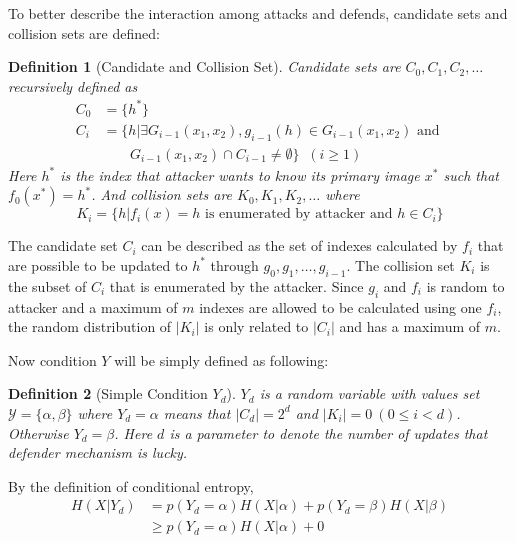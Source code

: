 \documentclass[10pt, conference, compsocconf]{IEEEtran}
\newtheorem{mydef}{Definition}
\begin{document}
        To better describe the interaction among attacks
        and defends, candidate sets and collision sets are defined:
        \begin{mydef}[Candidate and Collision Set]
            Candidate sets are $C_0, C_1, C_2, \ldots$ recursively defined as
            \begin{align*}
                C_0 &= \{h^*\}\\
                C_i &= \{h | \exists G_{i-1}(x_1, x_2),
                    g_{i-1}(h) \in G_{i-1}(x_1, x_2) \text{ and } \\
                    & \;\;\;\;\;\;\; G_{i-1}(x_1, x_2) \cap C_{i-1} \neq \emptyset \} \;\;(i \geq 1)
            \end{align*}
            Here $h^*$ is the index that attacker wants to know its primary image
            $x^*$ such that $f_0(x^*) = h^*$. And collision sets are $K_0, K_1, K_2, \ldots$ where
            \begin{equation*}
                K_i = \{h | f_i(x) = h \text{ is enumerated by attacker and } h \in C_i \}
            \end{equation*}
        \end{mydef}

        The candidate set $C_i$ can be described as the set of indexes
        calculated by $f_i$ that are possible to be
        updated to $h^*$ through $g_0, g_1, \ldots, g_{i-1}$. The collision set $K_i$ is the
        subset of $C_i$ that is enumerated by the attacker. Since $g_i$ and $f_i$ is random
        to attacker and a maximum of $m$ indexes are allowed to be calculated using one $f_i$,
        the random distribution of $|K_i|$ is only related to $|C_i|$ and has a maximum
        of $m$.

        Now condition $Y$ will be simply defined as following:
        \begin{mydef}[Simple Condition $Y_d$]
            $Y_d$ is a random variable with values set
            $\mathcal Y = \{ \alpha, \beta \}$ where
            $Y_d = \alpha$ means that $|C_d| = 2^d$
            and $|K_i| = 0~(0 \leq i < d)$.
            Otherwise $Y_d = \beta$.
            Here $d$ is a parameter to denote the number
            of updates that defender mechanism is lucky.
        \end{mydef}

        By the definition of conditional entropy,
        \begin{align*}
            H(X|Y_d) &= p(Y_d = \alpha) H(X | \alpha) + p(Y_d = \beta) H(X | \beta)\\
                &\geq p(Y_d = \alpha) H(X | \alpha) + 0
        \end{align*}
\end{document}
